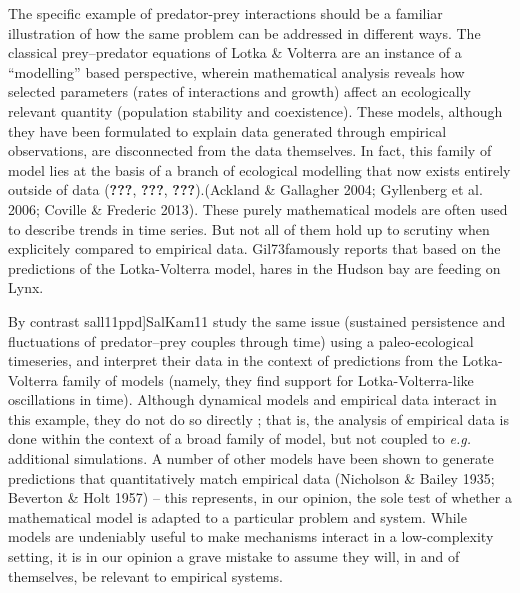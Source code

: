 \documentclass[11pt,serif]{article}
\begin{document}
The specific example of predator-prey interactions should be a familiar
illustration of how the same problem can be addressed in different ways.
The classical prey--predator equations of Lotka \& Volterra are an
instance of a ``modelling'' based perspective, wherein mathematical
analysis reveals how selected parameters (rates of interactions and
growth) affect an ecologically relevant quantity (population stability
and coexistence). These models, although they have been formulated to
explain data generated through empirical observations, are disconnected
from the data themselves. In fact, this family of model lies at the
basis of a branch of ecological modelling that now exists entirely
outside of data \color{gray}({\textbf{???}}, {\textbf{???}},
{\textbf{???}}).\color{black}\color{purple}(Ackland \& Gallagher 2004;
Gyllenberg et al. 2006; Coville \& Frederic 2013). These
purely\color{black} \color{purple}mathematical models are often used to
describe trends in time series. But not\color{black} \color{purple}all
of them hold up to scrutiny when explicitely compared to empirical
data.\color{black} \color{purple}Gil73famously reports that based on the
predictions of the Lotka-Volterra\color{black} \color{purple}model,
hares in the Hudson bay are feeding on Lynx.\color{black}

By contrast
\color{gray}{[}sall11ppd{]}\color{black}\color{purple}SalKam11\color{black}
study the same issue (sustained persistence and fluctuations of
predator--prey couples through time) using a paleo-ecological
timeseries, and interpret their data in the context of predictions from
the Lotka-Volterra family of models (namely, they find support for
Lotka-Volterra-like oscillations in time). Although dynamical models and
empirical data interact in this example, they do not do so directly ;
that is, the analysis of empirical data is done within the context of a
broad family of model, but not coupled to \emph{e.g.} additional
simulations. \color{purple}A number of other\color{black}
\color{purple}models have been shown to generate predictions that
quantitatively match\color{black} \color{purple}empirical data
(Nicholson \& Bailey 1935; Beverton \& Holt 1957) -- this represents, in
our opinion, the\color{black} \color{purple}sole test of whether a
mathematical model is adapted to a particular problem and\color{black}
\color{purple}system. While models are undeniably useful to make
mechanisms interact in a\color{black} \color{purple}low-complexity
setting, it is in our opinion a grave mistake to assume
they\color{black} \color{purple}will, in and of themselves, be relevant
to empirical systems.\color{black}
\end{document}
